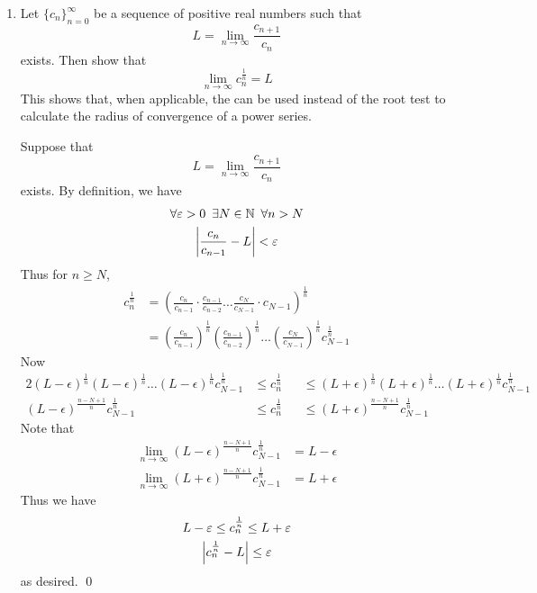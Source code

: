 \documentclass[11pt, oneside]{book}
\begin{document}
\begin{enumerate}
	\item Let $\{c_n\}_{n = 0}^\infty$ be a sequence of positive real numbers such that
		\begin{equation*}
			L = \lim_{n \to \infty} \frac{c_{n + 1}}{c_n}
		\end{equation*}
		exists. Then show that
		\begin{equation*}
			\lim_{n \to \infty} c_n^{\frac{1}{n}} = L
		\end{equation*}
		This shows that, when applicable, the  can be used instead of the root test to calculate the radius of convergence of a power series.

		\begin{solution}
			Suppose that
			\begin{equation*}
				L = \lim_{n \to \infty} \frac{c_{n + 1}}{c_n}
			\end{equation*}
			exists. By definition, we have
			\begin{gather*}
				\forall \varepsilon > 0 \enspace \exists N \in \mathbb{N} \enspace \forall n > N \\
				\left|\frac{c_n}{c_{n - 1}} - L\right| < \varepsilon
			\end{gather*}
			Thus for $n \geq N$,
			\begin{align*}
				c_n ^\frac{1}{n}
					&= \left(\frac{c_n}{c_{n - 1}} \cdot \frac{c_{n - 1}}{c_{n - 2}} \hdots \frac{c_N}{c_{N - 1}} \cdot c_{N - 1} \right)^\frac{1}{n} \\
					&= \left(\frac{c_n}{c_{n - 1}}\right)^\frac{1}{n} \left(\frac{c_{n - 1}}{c_{n - 2}} \right)^\frac{1}{n} \hdots \left(\frac{c_N}{c_{N - 1}} \right)^\frac{1}{n} c_{N - 1}^\frac{1}{n}
			\end{align*}
			Now
			\begin{alignat*}{2}
				(L - \epsilon)^\frac{1}{n} (L - \epsilon)^\frac{1}{n} \hdots (L - \epsilon)^\frac{1}{n}  c_{N - 1}^\frac{1}{n} &\leq c_n^\frac{1}{n} &&\leq (L + \epsilon)^\frac{1}{n} (L + \epsilon)^\frac{1}{n}  \hdots (L + \epsilon)^\frac{1}{n} c_{N - 1}^\frac{1}{n} \\
				(L - \epsilon)^\frac{n - N + 1}{n} c_{N - 1}^\frac{1}{n} &\leq c_n^\frac{1}{n} &&\leq (L + \epsilon)^\frac{n - N + 1}{n} c_{N - 1}^\frac{1}{n} 
			\end{alignat*}
			Note that
			\begin{align*}
				\lim_{n \to \infty} (L - \epsilon)^\frac{n - N + 1}{n} c_{N - 1}^\frac{1}{n} &= L - \epsilon \\
				\lim_{n \to \infty} (L + \epsilon)^\frac{n - N + 1}{n} c_{N - 1}^\frac{1}{n} &= L + \epsilon
			\end{align*}
			Thus we have
			\begin{gather*}
				L - \varepsilon \leq c_n^\frac{1}{n} \leq L + \varepsilon \\
				\left|c_n^\frac{1}{n} - L\right| \leq \varepsilon
			\end{gather*}
			as desired. \qed
		\end{solution}


\end{enumerate}
\end{document}
